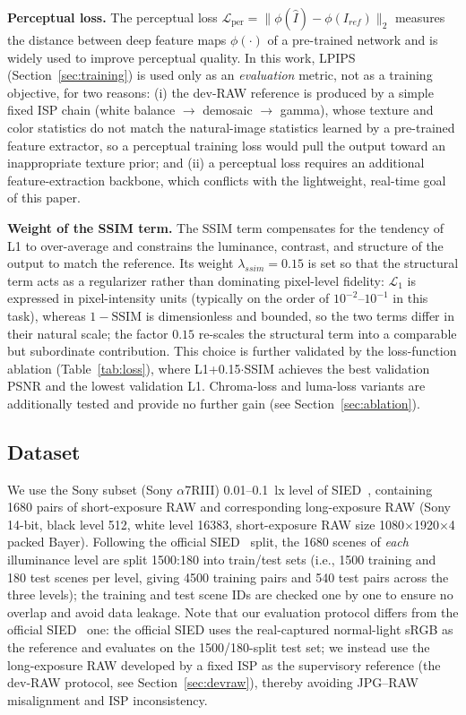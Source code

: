 \documentclass[remotesensing,article,accept,moreauthors]{Definitions/mdpi}
\begin{document}
\textbf{Perceptual loss.} The perceptual loss $\mathcal{L}_{\mathrm{per}}=\|\phi(\hat{I})-\phi(I_{ref})\|_2$ measures the distance between deep feature maps $\phi(\cdot)$ of a pre-trained network and is widely used to improve perceptual quality. In this work, LPIPS (Section~\ref{sec:training}) is used only as an \emph{evaluation} metric, not as a training objective, for two reasons: (i) the dev-RAW reference is produced by a simple fixed ISP chain (white balance $\rightarrow$ demosaic $\rightarrow$ gamma), whose texture and color statistics do not match the natural-image statistics learned by a pre-trained feature extractor, so a perceptual training loss would pull the output toward an inappropriate texture prior; and (ii) a perceptual loss requires an additional feature-extraction backbone, which conflicts with the lightweight, real-time goal of this paper.

\textbf{Weight of the SSIM term.} The SSIM term compensates for the tendency of L1 to over-average and constrains the luminance, contrast, and structure of the output to match the reference. Its weight $\lambda_{ssim}=0.15$ is set so that the structural term acts as a regularizer rather than dominating pixel-level fidelity: $\mathcal{L}_1$ is expressed in pixel-intensity units (typically on the order of $10^{-2}$--$10^{-1}$ in this task), whereas $1-\mathrm{SSIM}$ is dimensionless and bounded, so the two terms differ in their natural scale; the factor $0.15$ re-scales the structural term into a comparable but subordinate contribution. This choice is further validated by the loss-function ablation (Table~\ref{tab:loss}), where L1+0.15$\cdot$SSIM achieves the best validation PSNR and the lowest validation L1. Chroma-loss and luma-loss variants are additionally tested and provide no further gain (see Section~\ref{sec:ablation}).

\subsection{Dataset}

We use the Sony subset (Sony $\alpha$7RIII) 0.01--0.1~lx level of SIED~\citep{jiang2025sied}, containing 1680 pairs of short-exposure RAW and corresponding long-exposure RAW (Sony 14-bit, black level 512, white level 16383, short-exposure RAW size 1080$\times$1920$\times$4 packed Bayer). Following the official SIED~\citep{jiang2025sied} split, the 1680 scenes of \emph{each} illuminance level are split 1500:180 into train/test sets (i.e., 1500 training and 180 test scenes per level, giving 4500 training pairs and 540 test pairs across the three levels); the training and test scene IDs are checked one by one to ensure no overlap and avoid data leakage. Note that our evaluation protocol differs from the official SIED~\citep{jiang2025sied} one: the official SIED uses the real-captured normal-light sRGB as the reference and evaluates on the 1500/180-split test set; we instead use the long-exposure RAW developed by a fixed ISP as the supervisory reference (the dev-RAW protocol, see Section~\ref{sec:devraw}), thereby avoiding JPG--RAW misalignment and ISP inconsistency.
\end{document}
